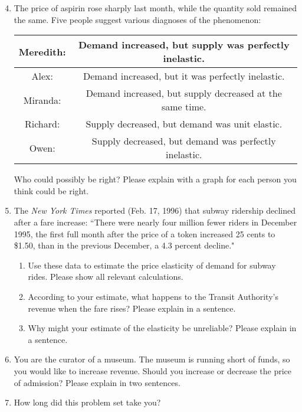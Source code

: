 \documentclass{article}
\begin{document}
\begin{enumerate}
\setcounter{enumi}{3}

\item The price of aspirin rose sharply last month, while the quantity sold remained the same. Five people suggest various diagnoses of the phenomenon:

	\begin{tabular}{| c | c |}
	\hline
	Meredith: & Demand increased, but supply was perfectly inelastic. \\
	\hline
	Alex: & Demand increased, but it was perfectly inelastic. \\
	\hline
	Miranda: & Demand increased, but supply decreased at the same time. \\
	\hline
	Richard: & Supply decreased, but demand was unit elastic. \\
	\hline
	Owen: & Supply decreased, but demand was perfectly inelastic. \\
	\hline
	\end{tabular}
	
	Who could possibly be right? Please explain with a graph for each person you think could be right.
	
\item The \textit{New York Times} reported (Feb. 17, 1996) that subway ridership declined after a fare increase: ``There were nearly four million fewer riders in December 1995, the first full month after the price of a token increased 25 cents to \$1.50, than in the previous December, a 4.3 percent decline."

	\begin{enumerate}
	
	\item Use these data to estimate the price elasticity of demand for subway rides. Please show all relevant calculations.
	
	\item According to your estimate, what happens to the Transit Authority's revenue when the fare rises? Please explain in a sentence.
	
	\item Why might your estimate of the elasticity be unreliable? Please explain in a sentence.
	
	\end{enumerate}
	
\item You are the curator of a museum. The museum is running short of funds, so you would like to increase revenue. Should you increase or decrease the price of admission? Please explain in two sentences.

\item How long did this problem set take you?

%
%

\end{enumerate}
\end{document}
